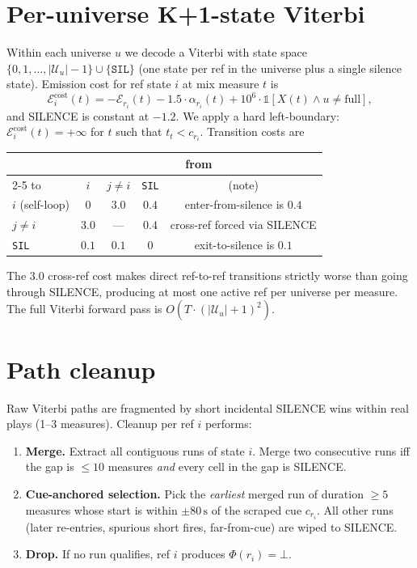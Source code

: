 \documentclass[11pt,a4paper]{article}
\begin{document}
\section{Per-universe K+1-state Viterbi}
\label{sec:vitu}

Within each universe $u$ we decode a Viterbi with state space $\{0, 1, \dots, |\mathcal{U}_u|{-}1\} \cup \{\texttt{SIL}\}$ (one state per ref in the universe plus a single silence state). Emission cost for ref state $i$ at mix measure $t$ is
\[
\mathcal{E}^{\text{cost}}_i(t) = -\mathcal{E}_{r_i}(t) - 1.5 \cdot \alpha_{r_i}(t) + 10^6 \cdot \mathbb{1}[X(t)\wedge u \ne \text{full}],
\]
and SILENCE is constant at $-1.2$. We apply a hard left-boundary: $\mathcal{E}^{\text{cost}}_i(t) = +\infty$ for $t$ such that $t_t < c_{r_i}$. Transition costs are
\begin{center}
\begin{tabular}{@{}lcccc@{}}
\toprule
& \multicolumn{4}{c}{from} \\
\cmidrule{2-5}
to & $i$ & $j \ne i$ & \texttt{SIL} & (note) \\
\midrule
$i$ (self-loop) & $0$ & $3.0$ & $0.4$ & enter-from-silence is $0.4$ \\
$j \ne i$ & $3.0$ & --- & $0.4$ & cross-ref forced via SILENCE \\
\texttt{SIL} & $0.1$ & $0.1$ & $0$ & exit-to-silence is $0.1$ \\
\bottomrule
\end{tabular}
\end{center}
The $3.0$ cross-ref cost makes direct ref-to-ref transitions strictly worse than going through SILENCE, producing at most one active ref per universe per measure. The full Viterbi forward pass is $O(T \cdot (|\mathcal{U}_u|+1)^2)$.

\section{Path cleanup}
\label{sec:clean}

Raw Viterbi paths are fragmented by short incidental SILENCE wins within real plays (1--3 measures). Cleanup per ref $i$ performs:
\begin{enumerate}[leftmargin=1.5em, itemsep=0.1em]
\item \textbf{Merge.} Extract all contiguous runs of state $i$. Merge two consecutive runs iff the gap is $\le 10$ measures \emph{and} every cell in the gap is SILENCE.
\item \textbf{Cue-anchored selection.} Pick the \emph{earliest} merged run of duration $\ge 5$ measures whose start is within $\pm 80\,\text{s}$ of the scraped cue $c_{r_i}$. All other runs (later re-entries, spurious short fires, far-from-cue) are wiped to SILENCE.
\item \textbf{Drop.} If no run qualifies, ref $i$ produces $\Phi(r_i) = \bot$.
\end{enumerate}
\end{document}
